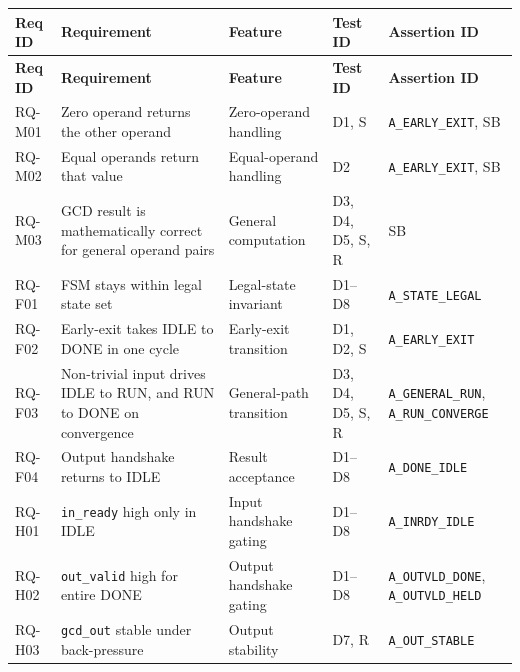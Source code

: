 \documentclass[11pt,a4paper]{article}
\begin{document}
{\small
\begin{longtable}{@{}p{1.3cm} p{5.0cm} p{2.8cm} p{1.4cm} p{3.2cm}@{}}
\toprule
\textbf{Req ID} & \textbf{Requirement} & \textbf{Feature} & \textbf{Test ID} & \textbf{Assertion ID} \\
\midrule
\endfirsthead

\toprule
\textbf{Req ID} & \textbf{Requirement} & \textbf{Feature} & \textbf{Test ID} & \textbf{Assertion ID} \\
\midrule
\endhead

\bottomrule
\endfoot

RQ-M01 & Zero operand returns the other operand & Zero-operand handling & D1, S & \texttt{A\_EARLY\_EXIT}, SB \\

RQ-M02 & Equal operands return that value & Equal-operand handling & D2 & \texttt{A\_EARLY\_EXIT}, SB \\

RQ-M03 & GCD result is mathematically correct for general operand pairs & General computation & D3, D4, D5, S, R & SB \\

RQ-F01 & FSM stays within legal state set & Legal-state invariant & D1--D8 & \texttt{A\_STATE\_LEGAL} \\

RQ-F02 & Early-exit takes IDLE to DONE in one cycle & Early-exit transition & D1, D2, S & \texttt{A\_EARLY\_EXIT} \\

RQ-F03 & Non-trivial input drives IDLE to RUN, and RUN to DONE on convergence & General-path transition & D3, D4, D5, S, R & \texttt{A\_GENERAL\_RUN}, \texttt{A\_RUN\_CONVERGE} \\

RQ-F04 & Output handshake returns to IDLE & Result acceptance & D1--D8 & \texttt{A\_DONE\_IDLE} \\

RQ-H01 & \texttt{in\_ready} high only in IDLE & Input handshake gating & D1--D8 & \texttt{A\_INRDY\_IDLE} \\

RQ-H02 & \texttt{out\_valid} high for entire DONE & Output handshake gating & D1--D8 & \texttt{A\_OUTVLD\_DONE}, \texttt{A\_OUTVLD\_HELD} \\

RQ-H03 & \texttt{gcd\_out} stable under back-pressure & Output stability & D7, R & \texttt{A\_OUT\_STABLE} \\


\end{longtable}}
\end{document}
